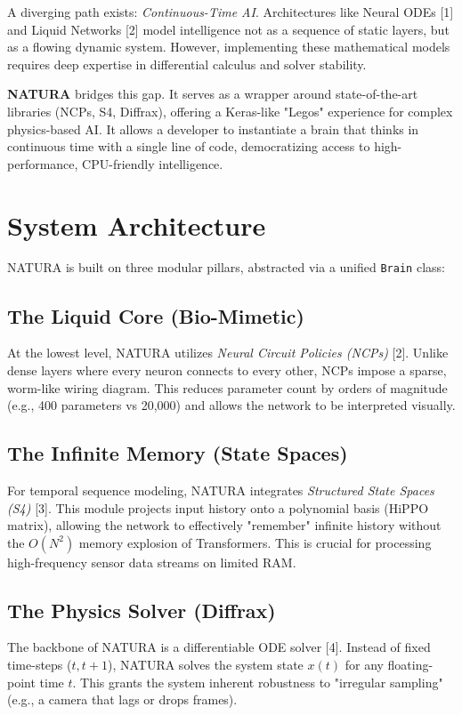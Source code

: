 \documentclass[journal]{IEEEtran}
\begin{document}
A diverging path exists: \textit{Continuous-Time AI}. Architectures like Neural ODEs [1] and Liquid Networks [2] model intelligence not as a sequence of static layers, but as a flowing dynamic system. However, implementing these mathematical models requires deep expertise in differential calculus and solver stability.

\textbf{NATURA} bridges this gap. It serves as a wrapper around state-of-the-art libraries (NCPs, S4, Diffrax), offering a Keras-like "Legos" experience for complex physics-based AI. It allows a developer to instantiate a brain that thinks in continuous time with a single line of code, democratizing access to high-performance, CPU-friendly intelligence.

\section{System Architecture}

NATURA is built on three modular pillars, abstracted via a unified \texttt{Brain} class:

\subsection{The Liquid Core (Bio-Mimetic)}
At the lowest level, NATURA utilizes \textit{Neural Circuit Policies (NCPs)} [2]. Unlike dense layers where every neuron connects to every other, NCPs impose a sparse, worm-like wiring diagram. This reduces parameter count by orders of magnitude (e.g., 400 parameters vs 20,000) and allows the network to be interpreted visually.

\subsection{The Infinite Memory (State Spaces)}
For temporal sequence modeling, NATURA integrates \textit{Structured State Spaces (S4)} [3]. This module projects input history onto a polynomial basis (HiPPO matrix), allowing the network to effectively "remember" infinite history without the $O(N^2)$ memory explosion of Transformers. This is crucial for processing high-frequency sensor data streams on limited RAM.

\subsection{The Physics Solver (Diffrax)}
The backbone of NATURA is a differentiable ODE solver [4]. Instead of fixed time-steps ($t, t+1$), NATURA solves the system state $x(t)$ for any floating-point time $t$. This grants the system inherent robustness to "irregular sampling" (e.g., a camera that lags or drops frames).
\end{document}
